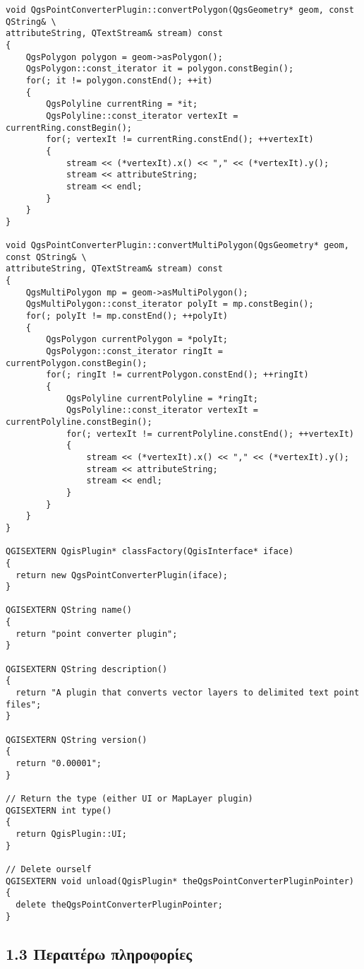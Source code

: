 \begin{verbatim}
void QgsPointConverterPlugin::convertPolygon(QgsGeometry* geom, const QString& \
attributeString, QTextStream& stream) const
{
    QgsPolygon polygon = geom->asPolygon();
    QgsPolygon::const_iterator it = polygon.constBegin();
    for(; it != polygon.constEnd(); ++it)
    {
        QgsPolyline currentRing = *it;
        QgsPolyline::const_iterator vertexIt = currentRing.constBegin();
        for(; vertexIt != currentRing.constEnd(); ++vertexIt)
        {
            stream << (*vertexIt).x() << "," << (*vertexIt).y();
            stream << attributeString;
            stream << endl;
        }
    }
}

void QgsPointConverterPlugin::convertMultiPolygon(QgsGeometry* geom, const QString& \
attributeString, QTextStream& stream) const
{
    QgsMultiPolygon mp = geom->asMultiPolygon();
    QgsMultiPolygon::const_iterator polyIt = mp.constBegin();
    for(; polyIt != mp.constEnd(); ++polyIt)
    {
        QgsPolygon currentPolygon = *polyIt;
        QgsPolygon::const_iterator ringIt = currentPolygon.constBegin();
        for(; ringIt != currentPolygon.constEnd(); ++ringIt)
        {
            QgsPolyline currentPolyline = *ringIt;
            QgsPolyline::const_iterator vertexIt = currentPolyline.constBegin();
            for(; vertexIt != currentPolyline.constEnd(); ++vertexIt)
            {
                stream << (*vertexIt).x() << "," << (*vertexIt).y();
                stream << attributeString;
                stream << endl;
            }
        }
    }
}

QGISEXTERN QgisPlugin* classFactory(QgisInterface* iface)
{
  return new QgsPointConverterPlugin(iface);
}

QGISEXTERN QString name()
{
  return "point converter plugin";
}

QGISEXTERN QString description()
{
  return "A plugin that converts vector layers to delimited text point files";
}

QGISEXTERN QString version()
{
  return "0.00001";
}

// Return the type (either UI or MapLayer plugin)
QGISEXTERN int type()
{
  return QgisPlugin::UI;
}

// Delete ourself
QGISEXTERN void unload(QgisPlugin* theQgsPointConverterPluginPointer)
{
  delete theQgsPointConverterPluginPointer;
}

\end{verbatim}

\subsection{1.3 Περαιτέρω πληροφορίες}

